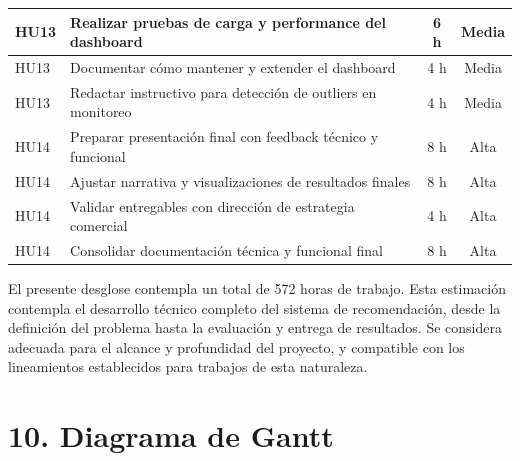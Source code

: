 \documentclass[
11pt, %
]{charter}
\begin{document}
\begin{longtable}{|p{2cm}|p{10cm}|c|c|}
HU13 & Realizar pruebas de carga y performance del dashboard & 6 h & Media \\ \hline
HU13 & Documentar cómo mantener y extender el dashboard & 4 h & Media \\ \hline
HU13 & Redactar instructivo para detección de outliers en monitoreo & 4 h & Media \\ \hline
HU14 & Preparar presentación final con feedback técnico y funcional & 8 h & Alta \\ \hline
HU14 & Ajustar narrativa y visualizaciones de resultados finales & 8 h & Alta \\ \hline
HU14 & Validar entregables con dirección de estrategia comercial & 4 h & Alta \\ \hline
HU14 & Consolidar documentación técnica y funcional final & 8 h & Alta \\ \hline

\end{longtable}

El presente desglose contempla un total de 572 horas de trabajo. Esta estimación contempla el desarrollo técnico completo del sistema de recomendación, desde la definición del problema hasta la evaluación y entrega de resultados. Se considera adecuada para el alcance y profundidad del proyecto, y compatible con los lineamientos establecidos para trabajos de esta naturaleza.

\section{10. Diagrama de Gantt}
\label{sec:gantt}
\end{document}
